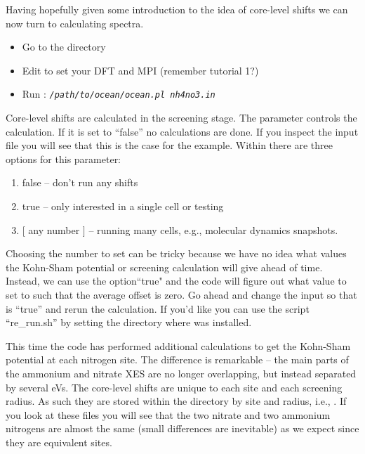 \documentclass[11pt]{report}
\begin{document}
Having hopefully given some introduction to the idea of core-level shifts we can now turn to calculating spectra. 
\begin{itemize}
\item Go to the  directory
\item Edit  to set your DFT and MPI (remember tutorial 1?)
\item Run :  \texttt{\textsl{/path/to/ocean/ocean.pl nh4no3.in}}
\end{itemize} 
%
%
%
%
Core-level shifts are calculated in the screening stage. The parameter  controls the calculation. If it is set to ``false'' no calculations are done. If you inspect the  input file you will see that this is the case for the example. Within  there are three options for this parameter:
\begin{enumerate}
\item false -- don't run any shifts
\item true -- only interested in a single cell or testing
\item $[$ any number $]$ -- running many cells, e.g., molecular dynamics snapshots.
\end{enumerate}
Choosing the number to set  can be tricky because we have no idea what values the Kohn-Sham potential or screening calculation will give ahead of time. Instead, we can use the option``true" and the code will figure out what value to set  to such that the average offset is zero. Go ahead and change the input so that  is ``true'' and rerun the calculation. If you'd like you can use the script ``re\_run.sh'' by setting the directory where  was installed. 

This time the code has performed additional calculations to get the Kohn-Sham potential at each nitrogen site. The difference is remarkable -- the main parts of the ammonium and nitrate XES are no longer overlapping, but instead separated by several eVs. The core-level shifts are unique to each site and each screening radius. As such they are stored within the  directory by site and radius, i.e., . If you look at these files you will see that the two nitrate and two ammonium nitrogens are almost the same (small differences are inevitable) as we expect since they are equivalent sites. 
\end{document}

